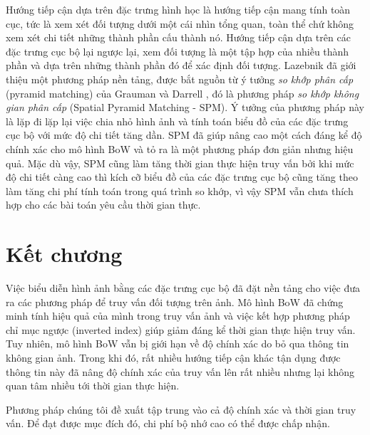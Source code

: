 Hướng tiếp cận dựa trên đặc trưng hình học là hướng tiếp cận mang tính toàn cục, tức là xem xét đối tượng dưới một cái nhìn tổng quan, toàn thể chứ không xem xét chi tiết những thành phần cấu thành nó. Hướng tiếp cận dựa trên các đặc trưng cục bộ lại ngược lại, xem đối tượng là một tập hợp của nhiều thành phần và dựa trên những thành phần đó để xác định đối tượng. Lazebnik \cite{lazebnik2006beyond} đã giới thiệu một phương pháp nền tảng, được bắt nguồn từ ý tưởng \textit{so khớp phân cấp} (pyramid matching) của Grauman và Darrell \cite{grauman2005pyramid}, đó là phương pháp \textit{so khớp không gian phân cấp} (Spatial Pyramid Matching - SPM). Ý tưởng của phương pháp này là lặp đi lặp lại việc chia nhỏ hình ảnh và tính toán biểu đồ của các đặc trưng cục bộ với mức độ chi tiết tăng dần. SPM đã giúp nâng cao một cách đáng kể độ chính xác cho mô hình BoW và tỏ ra là một phương pháp đơn giản nhưng hiệu quả. Mặc dù vậy, SPM cũng làm tăng thời gian thực hiện truy vấn bởi khi mức độ chi tiết càng cao thì kích cỡ biểu đồ của các đặc trưng cục bộ cũng tăng theo làm tăng chi phí tính toán trong quá trình so khớp, vì vậy SPM vẫn chưa thích hợp cho các bài toán yêu cầu thời gian thực.

\section{Kết chương}

Việc biểu diễn hình ảnh bằng các đặc trưng cục bộ đã đặt nền tảng cho việc đưa ra các phương pháp để truy vấn đối tượng trên ảnh. Mô hình BoW đã chứng minh tính hiệu quả của mình trong truy vấn ảnh và việc kết hợp phương pháp chỉ mục ngược (inverted index) giúp giảm đáng kể thời gian thực hiện truy vấn. Tuy nhiên, mô hình BoW vẫn bị giới hạn về độ chính xác do bỏ qua thông tin không gian ảnh. Trong khi đó, rất nhiều hướng tiếp cận khác tận dụng được thông tin này đã nâng độ chính xác của truy vấn lên rất nhiều nhưng lại không quan tâm nhiều tới thời gian thực hiện.

Phương pháp chúng tôi đề xuất tập trung vào cả độ chính xác và thời gian truy vấn. Để đạt được mục đích đó, chi phí bộ nhớ cao có thể được chấp nhận.

